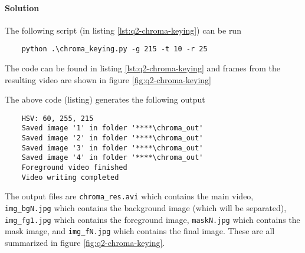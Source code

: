 \paragraph{Solution} The following script (in listing \ref{lst:q2-chroma-keying}) can be run

\begin{verbatim}
    python .\chroma_keying.py -g 215 -t 10 -r 25
\end{verbatim}

The code can be found in listing \ref{lst:q2-chroma-keying} and frames from the resulting video are shown in figure \ref{fig:q2-chroma-keying}



The above code (listing) generates the following output

\begin{verbatim}
    HSV: 60, 255, 215
    Saved image '1' in folder '****\chroma_out'
    Saved image '2' in folder '****\chroma_out'
    Saved image '3' in folder '****\chroma_out'
    Saved image '4' in folder '****\chroma_out'
    Foreground video finished
    Video writing completed
\end{verbatim}

The output files are \texttt{chroma\_res.avi} which contains the main video, \texttt{img\_bgN.jpg} which contains the background image (which will be separated), \texttt{img\_fg1.jpg} which contains the foreground image, \texttt{maskN.jpg} which contains the mask image, and \texttt{img\_fN.jpg} which contains the final image. These are all summarized in figure \ref{fig:q2-chroma-keying}.


